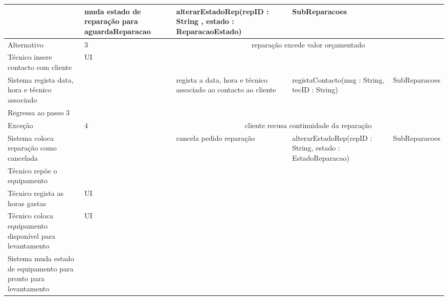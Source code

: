 \documentclass[../relatorio.tex]{subfiles}
\begin{document}
\begin{landscape}
\begin{table}[!h]
\begin{tabular}{|p{5cm}|p{1cm}|p{4cm}|p{6cm}|p{3cm}|}
                     & muda estado de reparação para aguardaReparacao
                     & alterarEstadoRep(repID : String , estado : ReparacaoEstado)
                     & SubReparacoes
            \\
            \hline
            \rowcolor{green!30}
            Alternativo  & 3                                                 &  \multicolumn{3}{c}{reparação excede valor orçamentado}\\
            \hline
            \rowcolor{yellow}
            Técnico insere contacto com cliente
                     & UI
                     & 
                     & 
                     & 
            \\
            \hline
            Sistema regista data, hora e técnico associado
                     & 
                     & regista a data, hora e técnico associado ao contacto ao cliente 
                     & registaContacto(msg : String, tecID : String)
                     & SubReparacoes
            \\
            \hline
            Regressa ao passo 3
                     & 
                     & 
                     & 
                     & 
            \\
            \hline
            \rowcolor{red!30}
            Exceção  & 4                                               &  \multicolumn{3}{c}{cliente recusa continuidade da reparação}\\
            \hline
            Sistema coloca reparação como cancelada
                     & 
                     & cancela pedido reparação
                     & alterarEstadoRep(repID : String, estado : EstadoReparacao)
                     & SubReparacoes
            \\
            \hline
            Técnico repõe o equipamento
                     & 
                     & 
                     & 
                     & 
            \\
            \hline
            \rowcolor{yellow}
            Técnico regista as horas gastas
                     & UI
                     & 
                     & 
                     & 
            \\
            \hline
            \rowcolor{yellow}
            Técnico coloca equipamento disponível para levantamento
                     & UI
                     & 
                     & 
                     & 
            \\
            \hline
            Sistema muda estado de equipamento para pronto para levantamento

\end{tabular}
\end{table}
\end{landscape}
\end{document}
